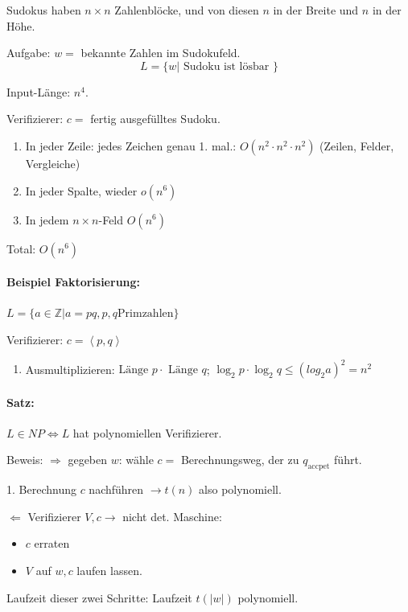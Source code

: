 Sudokus haben $n \times n$ Zahlenblöcke, und von diesen $n$ in der Breite und $n$ in der Höhe.

Aufgabe: $w =$ bekannte Zahlen im Sudokufeld.
\[
	L = \{ w | \text{ Sudoku ist lösbar }\}
\]

Input-Länge: $n^4$.

Verifizierer: $c = $ fertig ausgefülltes Sudoku.
\begin{enumerate}
	\item In jeder Zeile: jedes Zeichen genau 1. mal.: $O(n^2 \cdot  n^2 \cdot n^2)$ (Zeilen, Felder, Vergleiche)
	\item In jeder Spalte, wieder $o(n^6)$
	\item In jedem $n \times n$-Feld $O(n^6)$
\end{enumerate}
Total: $O(n^6)$

\paragraph{Beispiel Faktorisierung:} $L= \{ a \in \mathbb{Z} | a = pq, p,q \text{Primzahlen} \}$

Verifizierer: $c = \left<p,q\right>$

\begin{enumerate}
	\item Ausmultiplizieren: $\text{Länge } p \cdot \text{ Länge } q$; $\log_2{p} \cdot \log_2{q} \leq (log_2{a})^2 = n^2$
\end{enumerate}

\paragraph{Satz: } $L \in NP \Leftrightarrow L$ hat polynomiellen Verifizierer.

Beweis: $\Rightarrow$ gegeben $w$: wähle $c=$ Berechnungsweg, der zu $q_\text{accpet}$ führt.

1. Berechnung $c$ nachführen $\longrightarrow t(n)$ also polynomiell.

$\Leftarrow$ Verifizierer $V, c \rightarrow$ nicht det. Maschine:
\begin{itemize}
	\item $c$ erraten
	\item $V$ auf $w,c$ laufen lassen.
\end{itemize}
Laufzeit dieser zwei Schritte: Laufzeit $t(|w|)$ polynomiell.

